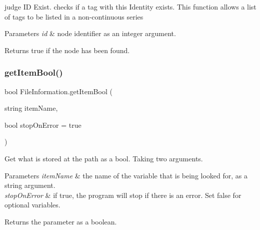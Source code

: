 judge ID Exist. checks if a tag with this Identity exists. This function allows a list of tags to be listed in a non-\/continuous series 


\begin{DoxyParams}{Parameters}
{\em id} & node identifier as an integer argument. \\
\hline
\end{DoxyParams}
\begin{DoxyReturn}{Returns}
true if the node has been found. 
\end{DoxyReturn}
\mbox{\label{class_file_information_a1e9c6e7a91a72a839f3bb5d0430b1cfa}} 
\subsubsection{\texorpdfstring{getItemBool()}{getItemBool()}\hspace{0.1cm}{\footnotesize\ttfamily [1/2]}}
{\footnotesize\ttfamily bool File\+Information.\+get\+Item\+Bool (\begin{DoxyParamCaption}\item[{string}]{item\+Name,  }\item[{bool}]{stop\+On\+Error = {\ttfamily true} }\end{DoxyParamCaption})\hspace{0.3cm}{\ttfamily [inline]}}



Get what is stored at the path as a bool. Taking two arguments. 


\begin{DoxyParams}{Parameters}
{\em item\+Name} & the name of the variable that is being looked for, as a string argument. \\
\hline
{\em stop\+On\+Error} & if true, the program will stop if there is an error. Set false for optional variables. \\
\hline
\end{DoxyParams}
\begin{DoxyReturn}{Returns}
the parameter as a boolean. 
\end{DoxyReturn}
\mbox{\label{class_file_information_a3b20f9677af078231820adefd319dd4d}} 
